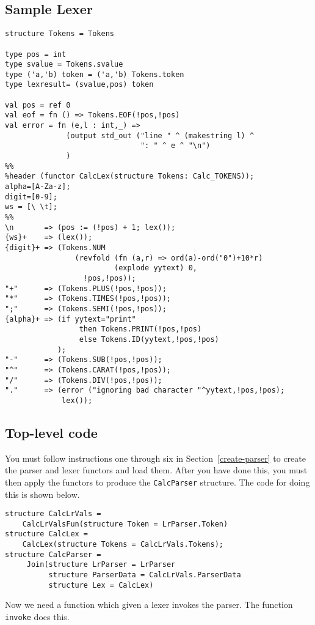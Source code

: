 \subsection{Sample Lexer}
\begin{tt}
\begin{verbatim}
structure Tokens = Tokens

type pos = int
type svalue = Tokens.svalue
type ('a,'b) token = ('a,'b) Tokens.token
type lexresult= (svalue,pos) token

val pos = ref 0
val eof = fn () => Tokens.EOF(!pos,!pos)
val error = fn (e,l : int,_) =>
              (output std_out ("line " ^ (makestring l) ^
                               ": " ^ e ^ "\n")
              )
%%
%header (functor CalcLex(structure Tokens: Calc_TOKENS));
alpha=[A-Za-z];
digit=[0-9];
ws = [\ \t];
%%
\n       => (pos := (!pos) + 1; lex());
{ws}+    => (lex());
{digit}+ => (Tokens.NUM
                (revfold (fn (a,r) => ord(a)-ord("0")+10*r)
                         (explode yytext) 0,
                  !pos,!pos));
"+"      => (Tokens.PLUS(!pos,!pos));
"*"      => (Tokens.TIMES(!pos,!pos));
";"      => (Tokens.SEMI(!pos,!pos));
{alpha}+ => (if yytext="print"
                 then Tokens.PRINT(!pos,!pos)
                 else Tokens.ID(yytext,!pos,!pos)
            );
"-"      => (Tokens.SUB(!pos,!pos));
"^"      => (Tokens.CARAT(!pos,!pos));
"/"      => (Tokens.DIV(!pos,!pos));
"."      => (error ("ignoring bad character "^yytext,!pos,!pos);
             lex());
\end{verbatim}
\end{tt}
\subsection{Top-level code}

You must follow instructions one through six in Section~\ref{create-parser}
to create the parser and lexer functors and load them.  After you have
done this, you must then apply the functors to produce the {\tt CalcParser}
structure.  The code for doing this is shown below.
\begin{verbatim}
structure CalcLrVals =
    CalcLrValsFun(structure Token = LrParser.Token)
structure CalcLex =
    CalcLex(structure Tokens = CalcLrVals.Tokens);
structure CalcParser =
     Join(structure LrParser = LrParser
          structure ParserData = CalcLrVals.ParserData
          structure Lex = CalcLex)
\end{verbatim}
 
Now we need a function which given a lexer invokes the parser.  The
function {\tt invoke} does this.

